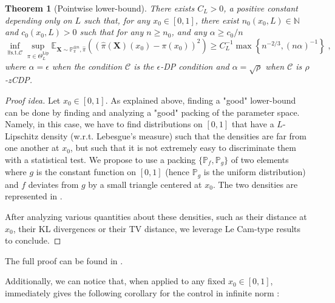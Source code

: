 \documentclass[10pt]{article} %
\newtheorem{theorem}{Theorem}
\newcommand{\N}[0]{\mathbb{N}}
\newcommand{\Prob}[0]{\mathbb{P}}
\newcommand{\E}[0]{\mathbb{E}}
\newcommand\vect[1]{\mathbf{#1}}
\newcommand\p[1]{\left( {#1}\right)}
\newcommand\RG[1]{\textcolor{red}{#1}}
\newcommand\mRG[1]{\marginpar{\tiny\RG{#1}}}
\newcommand\AG[1]{\textcolor{magenta}{#1}}
\newcommand\CL[1]{\textcolor{blue}{#1}}
\begin{document}
\begin{theorem}[Pointwise lower-bound]
\label{th:lpdp}
There exists $C_L>0$, %
a positive constant depending only on $L$ such that, for any $x_0 \in [0, 1]$, there exist $n_0(x_0, L) \in \N$ and $c_0(x_0, L) > 0$ such that for any $n \geq n_0$, and any $\alpha \geq c_0/n$
\begin{equation}
\label{eq:deftriangle}
    \inf_{\hat{\pi} \mathrm{ s.t. } \mathcal{C}} \sup_{\pi \in \Theta^{\mathrm{Lip}}_L}
    \E_{\vect{X} \sim \Prob_{\pi}^{\otimes n}, \hat{\pi}}\p{\p{\hat{\pi}(\vect{X})(x_0) - \pi(x_0)}^2} \geq C_L^{-1} \max \left\{ n^{-2/3}, (n\alpha)^{-1} \right\}
    \;,
\end{equation}
where $\alpha = \epsilon$ when the condition $\mathcal{C}$ is the $\epsilon$-DP condition and $\alpha = \sqrt{\rho}$ when %
$\mathcal{C}$ is $\rho$-zCDP.
\end{theorem}
\begin{proof}[Proof idea] %
Let $x_0 \in [0, 1]$.
As explained above, finding a "good" lower-bound can be done by finding and analyzing a "good" packing of the parameter space. Namely, in this case, we have to find distributions on $[0, 1]$ that have a $L$-Lipschitz density (w.r.t. Lebesgue's measure) such that the densities are far from one another at $x_0$, but such that it is not extremely easy to discriminate them with a statistical test.
We propose to use a packing $\{ \Prob_f, \Prob_g\}$ of two elements where $g$ is the constant function on $[0, 1]$ (hence $\Prob_g$ is the uniform distribution) and $f$ deviates from $g$ by a small triangle centered at $x_0$. The two densities are represented in .

After analyzing various quantities about these densities, such as their distance at $x_0$, their KL divergences or their TV distance, we leverage Le Cam-type results to conclude.
\end{proof}
The full proof can be found in .


Additionally, we can notice that, when applied to any fixed $x_0 \in [0, 1]$,  immediately gives the following corollary for the control in infinite norm :
\end{document}
